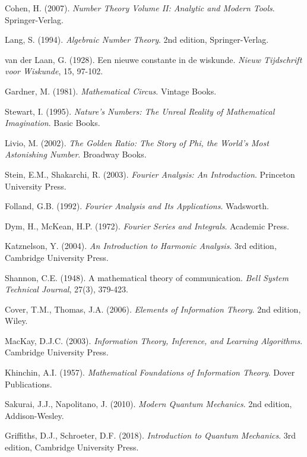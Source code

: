 \documentclass[12pt]{article}
\theoremstyle{plain}
\theoremstyle{definition}
\begin{document}
\begin{thebibliography}{99}
 Cohen, H. (2007). \emph{Number Theory Volume II: Analytic and Modern Tools}. Springer-Verlag.

 Lang, S. (1994). \emph{Algebraic Number Theory}. 2nd edition, Springer-Verlag.

 van der Laan, G. (1928). Een nieuwe constante in de wiskunde. \emph{Nieuw Tijdschrift voor Wiskunde}, 15, 97-102.

 Gardner, M. (1981). \emph{Mathematical Circus}. Vintage Books.

 Stewart, I. (1995). \emph{Nature's Numbers: The Unreal Reality of Mathematical Imagination}. Basic Books.

 Livio, M. (2002). \emph{The Golden Ratio: The Story of Phi, the World's Most Astonishing Number}. Broadway Books.

 Stein, E.M., Shakarchi, R. (2003). \emph{Fourier Analysis: An Introduction}. Princeton University Press.

 Folland, G.B. (1992). \emph{Fourier Analysis and Its Applications}. Wadsworth.

 Dym, H., McKean, H.P. (1972). \emph{Fourier Series and Integrals}. Academic Press.

 Katznelson, Y. (2004). \emph{An Introduction to Harmonic Analysis}. 3rd edition, Cambridge University Press.

 Shannon, C.E. (1948). A mathematical theory of communication. \emph{Bell System Technical Journal}, 27(3), 379-423.

 Cover, T.M., Thomas, J.A. (2006). \emph{Elements of Information Theory}. 2nd edition, Wiley.

 MacKay, D.J.C. (2003). \emph{Information Theory, Inference, and Learning Algorithms}. Cambridge University Press.

 Khinchin, A.I. (1957). \emph{Mathematical Foundations of Information Theory}. Dover Publications.

 Sakurai, J.J., Napolitano, J. (2010). \emph{Modern Quantum Mechanics}. 2nd edition, Addison-Wesley.

 Griffiths, D.J., Schroeter, D.F. (2018). \emph{Introduction to Quantum Mechanics}. 3rd edition, Cambridge University Press.


\end{thebibliography}
\end{document}
